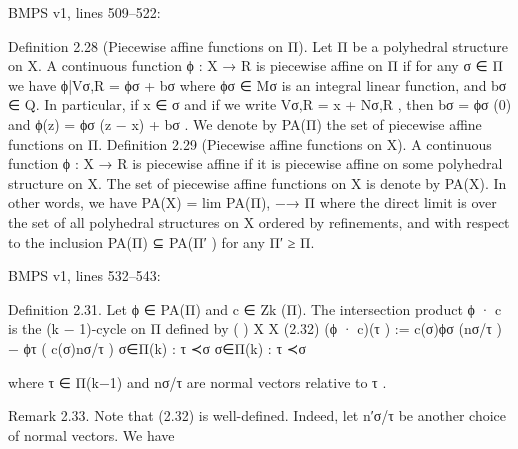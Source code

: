 \documentclass[
  11pt,
]{article}
\newenvironment{Shaded}{}{}
\newcommand{\NormalTok}[1]{#1}
\begin{document}
BMPS v1, lines 509--522:

\begin{Shaded}
\begin{Highlighting}[]
\NormalTok{Definition 2.28 (Piecewise affine functions on Π). Let Π be a polyhedral structure on X. A}
\NormalTok{continuous function ϕ : X → R is piecewise affine on Π if for any σ ∈ Π we have}
\NormalTok{                                           ϕ|Vσ,R = ϕσ + bσ}
\NormalTok{where ϕσ ∈ Mσ is an integral linear function, and bσ ∈ Q. In particular, if x ∈ σ and if we write}
\NormalTok{Vσ,R = x + Nσ,R , then bσ = ϕσ (0) and ϕ(z) = ϕσ (z − x) + bσ .}
\NormalTok{   We denote by PA(Π) the set of piecewise affine functions on Π.}
\NormalTok{Definition 2.29 (Piecewise affine functions on X). A continuous function ϕ : X → R is}
\NormalTok{piecewise affine if it is piecewise affine on some polyhedral structure on X. The set of piecewise}
\NormalTok{affine functions on X is denote by PA(X). In other words, we have}
\NormalTok{                                        PA(X) = lim PA(Π),}
\NormalTok{                                                −→}
\NormalTok{                                                   Π}
\NormalTok{where the direct limit is over the set of all polyhedral structures on X ordered by refinements, and}
\NormalTok{with respect to the inclusion PA(Π) ⊆ PA(Π′ ) for any Π′ ≥ Π.}
\end{Highlighting}
\end{Shaded}

BMPS v1, lines 532--543:

\begin{Shaded}
\begin{Highlighting}[]
\NormalTok{Definition 2.31. Let ϕ ∈ PA(Π) and c ∈ Zk (Π). The intersection product ϕ · c is the (k − 1){-}cycle}
\NormalTok{on Π defined by}
\NormalTok{                                                                                         (                               )}
\NormalTok{                                               X                                              X}
\NormalTok{(2.32)               (ϕ · c)(τ ) :=                         c(σ)ϕσ (nσ/τ ) − ϕτ (                            c(σ)nσ/τ )}
\NormalTok{                                          σ∈Π(k) : τ ≺σ                                   σ∈Π(k) : τ ≺σ}


\NormalTok{where τ ∈ Π(k−1) and nσ/τ are normal vectors relative to τ .}

\NormalTok{Remark 2.33. Note that (2.32) is well{-}defined. Indeed, let n′σ/τ be another choice of normal}
\NormalTok{vectors. We have}
\end{Highlighting}
\end{Shaded}
\end{document}
